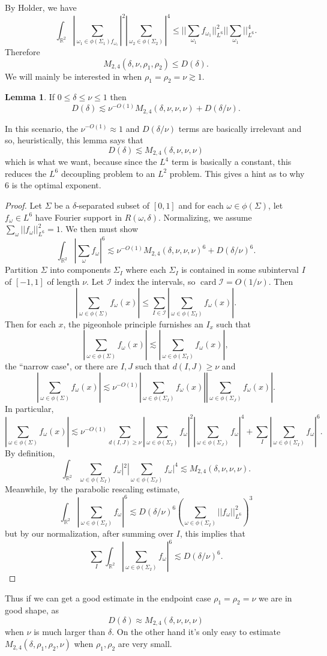 \documentclass[12pt]{report}
\newcommand{\RR}{\mathbb{R}}
\newcommand{\card}{\operatorname{card}}
\theoremstyle{definition}
\newtheorem{lemma}[theorem]{Lemma}
\begin{document}
By Holder, we have
$$\int_{\RR^2}|\sum_{\omega_1 \in \phi(\Sigma_1) f_{\omega_1}}|^2 |\sum_{\omega_2 \in \phi(\Sigma_2)}|^4
\leq ||\sum_{\omega_1} f_{\omega_1}||_{L^6}^2 ||\sum_{\omega_1}||_{L^6}^4.$$
Therefore
$$M_{2,4}(\delta, \nu, \rho_1, \rho_2) \leq D(\delta).$$
We will mainly be interested in when $\rho_1 = \rho_2 = \nu \gtrsim 1$.

\begin{lemma}
If $0 \leq \delta \leq \nu \leq 1$ then
$$D(\delta) \lesssim \nu^{-O(1)} M_{2,4}(\delta, \nu, \nu, \nu) + D(\delta/\nu).$$
\end{lemma}
In this scenario, the $\nu^{-O(1)} \approx 1$ and $D(\delta/\nu)$ terms are basically irrelevant and so, heuristically, this lemma says that
$$D(\delta) \lesssim M_{2,4}(\delta, \nu, \nu, \nu)$$
which is what we want, because since the $L^4$ term is basically a constant, this reduces the $L^6$ decoupling problem to an $L^2$ problem.
This gives a hint as to why $6$ is the optimal exponent.
\begin{proof}
Let $\Sigma$ be a $\delta$-separated subset of $[0, 1]$ and for each $\omega \in \phi(\Sigma)$, let $f_\omega \in L^6$ have Fourier support in $R(\omega, \delta)$.
Normalizing, we assume $\sum_\omega ||f_\omega||_{L^6}^2 = 1$. We then must show
$$\int_{\RR^2} |\sum_\omega f_\omega|^6 \lesssim \nu^{-O(1)} M_{2,4}(\delta, \nu, \nu, \nu)^6 + D(\delta/\nu)^6.$$
Partition $\Sigma$ into components $\Sigma_I$ where each $\Sigma_I$ is contained in some subinterval $I$ of $[-1, 1]$ of length $\nu$.
Let $\mathcal I$ index the intervals, so $\card \mathcal I = O(1/\nu)$. Then
$$|\sum_{\omega \in \phi(\Sigma)} f_\omega(x)| \leq \sum_{I \in \mathcal I}|\sum_{\omega \in \phi(\Sigma_I)} f_\omega(x)|.$$
Then for each $x$, the pigeonhole principle furnishes an $I_x$ such that
$$|\sum_{\omega \in \phi(\Sigma)} f_\omega(x)| \lesssim |\sum_{\omega \in \phi(\Sigma_I)} f_\omega(x)|,$$
the ``narrow case", or there are $I, J$ such that $d(I, J) \geq \nu$ and
$$|\sum_{\omega \in \phi(\Sigma)} f_\omega(x)| \lesssim \nu^{-O(1)}|\sum_{\omega \in \phi(\Sigma_I)} f_\omega(x)||\sum_{\omega \in \phi(\Sigma_J)} f_\omega(x)|.$$
In particular,
$$|\sum_{\omega \in \phi(\Sigma)} f_\omega(x)| \lesssim \nu^{-O(1)} \sum_{d(I, J) \geq \nu} |\sum_{\omega \in \phi(\Sigma_I)} f_\omega|^2|\sum_{\omega \in \phi(\Sigma_J)} f_\omega|^4 + \sum_I |\sum_{\omega \in \phi(\Sigma_I)} f_\omega|^6.$$
By definition,
$$\int_{\RR^2} \sum_{\omega \in \phi(\Sigma_I)} f_\omega|^2|\sum_{\omega \in \phi(\Sigma_J)} f_\omega|^4 \lesssim M_{2,4}(\delta, \nu, \nu, \nu).$$
Meanwhile, by the parabolic rescaling estimate,
$$\int_{\RR^2} |\sum_{\omega \in \phi(\Sigma_I)} f_\omega|^6 \lesssim D(\delta/\nu)^6 (\sum_{\omega \in \phi(\Sigma_I)} ||f_\omega||_{L^6}^2)^3$$
but by our normalization, after summing over $I$, this implies that
$$\sum_I \int_{\RR^2} |\sum_{\omega \in \phi(\Sigma_I)} f_\omega|^6 \lesssim D(\delta/\nu)^6.$$
\end{proof}
Thus if we can get a good estimate in the endpoint case $\rho_1 = \rho_2 = \nu$ we are in good shape, as
$$D(\delta) \approx M_{2,4}(\delta, \nu, \nu, \nu)$$
when $\nu$ is much larger than $\delta$.
On the other hand it's only easy to estimate $M_{2,4}(\delta, \rho_1, \rho_2, \nu)$ when $\rho_1,\rho_2$ are very small.
\end{document}
